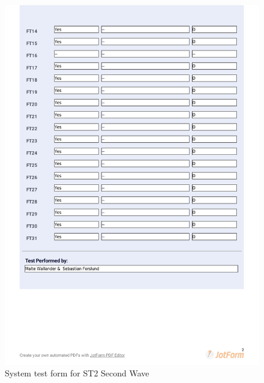 \documentclass{article}
\begin{document}
 \begin{figure}
     \centering
     \includegraphics[width=13cm]{images/2021-03-08_Malte_ST2-2}
     \renewcommand\figurename{Figure}
     \caption{System test form for ST2 Second Wave}
     \label{fig:my_label}
 \end{figure}
\end{document}
